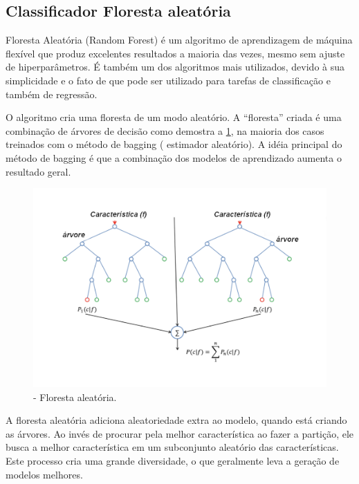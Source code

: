 \subsection{{Classificador Floresta aleatória}}

Floresta Aleatória (Random Forest) é um algoritmo de aprendizagem de máquina flexível que produz excelentes resultados a maioria das vezes, mesmo sem ajuste de hiperparâmetros. É também um dos algoritmos mais utilizados, devido à sua simplicidade e o fato de que pode ser utilizado para tarefas de classificação e também de regressão. 

O algoritmo cria uma floresta de um modo aleatório. A “floresta” criada é uma combinação de árvores de decisão como demostra a \ref{fig:randomfloresta}, na maioria dos casos treinados com o método de bagging ( estimador aleatório). A idéia principal do método de bagging é que a combinação dos modelos de aprendizado aumenta o resultado geral.


\begin{figure}[H]
\begin{center}
\includegraphics[width=13cm]{./02_Cap2/figures/forestRandom.png}
\caption{\label{fig:randomfloresta}- Floresta aleatória.}
\end{center}
\end{figure}



 A floresta aleatória adiciona aleatoriedade extra ao modelo, quando está criando as árvores. Ao invés de procurar pela melhor característica ao fazer a partição, ele busca a melhor característica em um subconjunto aleatório das características. Este processo cria uma grande diversidade, o que geralmente leva a geração de modelos melhores.

